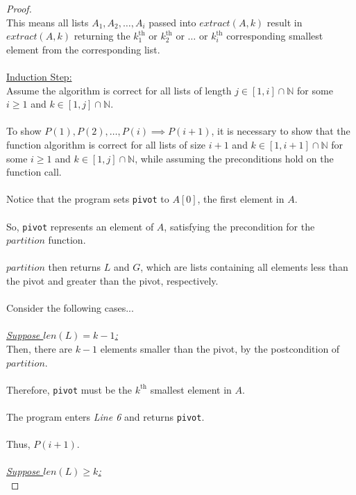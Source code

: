 \documentclass[12pt]{article}
\begin{document}
\begin{proof}
    \\
    This means all lists $A_1, A_2, \dots, A_i$ passed into $extract(A, k)$ result in $extract(A, k)$ returning the $k_1^{\text{th}}$ or $k_2^{\text{th}}$ or $\dots$ or $k_i^{\text{th}}$ corresponding smallest element from the corresponding list. \\
    \\
    \underline{Induction Step:} \\
    Assume the algorithm is correct for all lists of length $j \in [1, i] \cap \mathbb{N}$ for some $i \geq 1$ and $k \in [1, j] \cap \mathbb{N}$. \\
    \\
    To show $P(1), P(2), \dots, P(i) \implies P(i + 1)$, it is necessary to show that the function algorithm is correct for all lists of size $i + 1$ and $k \in [1, i + 1] \cap \mathbb{N}$ for some $i \geq 1$ and $k \in [1, j] \cap \mathbb{N}$, while assuming the preconditions hold on the function call. \\
    \\
    Notice that the program sets \texttt{pivot} to $A[0]$, the first element in $A$. \\
    \\
    So, \texttt{pivot} represents an element of $A$, satisfying the precondition for the $partition$ function. \\
    \\
    $partition$ then returns $L$ and $G$, which are lists containing all elements less than the pivot and greater than the pivot, respectively. \\
    \\
    Consider the following cases... \\
    \\
    \underline{\textit{Suppose $len(L) = k - 1$:}} \\
    Then, there are $k - 1$ elements smaller than the pivot, by the postcondition of $partition$. \\
    \\
    Therefore, \texttt{pivot} must be the $k^{\text{th}}$ smallest element in $A$. \\
    \\
    The program enters \textit{Line 6} and returns \texttt{pivot}. \\
    \\
    Thus, $P(i + 1)$. \\
    \\
    \underline{\textit{Suppose $len(L) \geq k$:}} \\

\end{proof}
\end{document}
